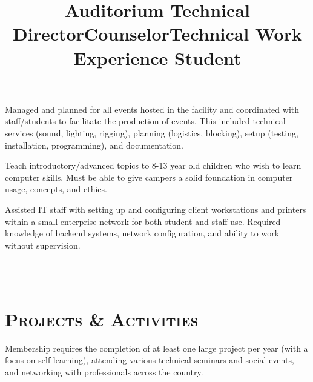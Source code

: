 \begin{resume}

\title{Auditorium Technical Director}
\begin{position}
Managed and planned for all events hosted in the facility and coordinated with staff/students to facilitate the production of events. This included technical services (sound, lighting, rigging), planning (logistics, blocking), setup (testing, installation, programming), and documentation. 
\end{position}

\title{Counselor}
\begin{position}
Teach introductory/advanced topics to 8-13 year old children who wish to learn computer skills. Must be able to give campers a solid foundation in computer usage, concepts, and ethics.
\end{position}

\title{Technical Work Experience Student}
\begin{position}
Assisted IT staff with setting up and configuring client workstations and printers within a small enterprise network for both student and staff use. Required knowledge of backend systems, network configuration, and ability to work without supervision.
\end{position}
\begin{formatb}
  \\
  \body\\
\end{formatb}

\section{\textsc{Projects \& Activities}}

\begin{position}
Membership requires the completion of at least one large project per year (with a focus on self-learning), attending various technical seminars and social events, and networking with professionals across the country.
\end{position}


\end{resume}
